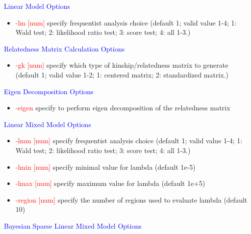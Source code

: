 \documentclass[11pt]{article}
\begin{document}
%
\textcolor{blue}{Linear Model Options}
%
\begin{itemize}
\item  \textcolor{red}{-lm       [num]}     \quad          specify frequentist analysis choice (default 1; valid value 1-4; 1: Wald test; 2: likelihood ratio test; 3: score test; 4: all 1-3.)
\end{itemize}
%
\textcolor{blue}{Relatedness Matrix Calculation Options}
%
\begin{itemize}
\item  \textcolor{red}{-gk       [num]}     \quad           specify which type of kinship/relatedness matrix to generate (default 1; valid value 1-2; 1: centered matrix; 2: standardized matrix.)
\end{itemize}
%
\textcolor{blue}{Eigen Decomposition Options}
%
\begin{itemize}
\item  \textcolor{red}{-eigen}     \quad           specify to perform eigen decomposition of the relatedness matrix
\end{itemize}
%
\textcolor{blue}{Linear Mixed Model Options}
%
\begin{itemize}
\item  \textcolor{red}{-lmm       [num]}     \quad          specify frequentist analysis choice (default 1; valid value 1-4; 1: Wald test; 2: likelihood ratio test; 3: score test; 4: all 1-3.)
\item  \textcolor{red}{-lmin     [num] }     \quad          specify minimal value for lambda (default 1e-5)
\item  \textcolor{red}{-lmax     [num] }     \quad          specify maximum value for lambda (default 1e+5)
\item  \textcolor{red}{-region   [num]}     \quad           specify the number of regions used to evaluate lambda (default 10)
\end{itemize}
%
\textcolor{blue}{Bayesian Sparse Linear Mixed Model Options}
%
\end{document}
